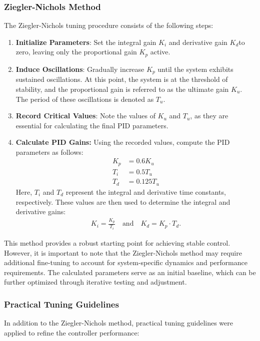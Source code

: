\subsubsection{Ziegler-Nichols Method}
The Ziegler-Nichols tuning procedure consists of the following steps:
\begin{enumerate}
	\item \textbf{Initialize Parameters}: Set the integral gain \( K_i \) and derivative gain \( K_d \)to zero, leaving only the proportional gain \( K_p \) active.
	\item \textbf{Induce Oscillations}: Gradually increase \( K_p \) until the system exhibits sustained oscillations. At this point, the system is at the threshold of stability, and the proportional gain is referred to as the ultimate gain \( K_u \). The period of these oscillations is denoted as \( T_u \).
	\item \textbf{Record Critical Values}: Note the values of \( K_u \) and \( T_u \), as they are essential for calculating the final PID parameters.
	\item \textbf{Calculate PID Gains:} Using the recorded values, compute the PID parameters as follows:
	\begin{equation}
	\begin{aligned}
		K_p &= 0.6K_u \\
		T_i &= 0.5T_u \\
		T_d &= 0.125T_u  \label{eq:eq}
	\end{aligned}
	\end{equation}
	Here, \( T_i \) and \( T_d \) represent the integral and derivative time constants, respectively. These values are then used to determine the integral and derivative gains:
	\begin{equation}
	\begin{aligned}
	K_i = \frac{K_p}{T_i} \quad \text{and} \quad K_d = K_p \cdot T_d.  \label{eq:eq}
	\end{aligned}
	\end{equation}
\end{enumerate}
	
This method provides a robust starting point for achieving stable control. However, it is important to note that the Ziegler-Nichols method may require additional fine-tuning to account for system-specific dynamics and performance requirements. The calculated parameters serve as an initial baseline, which can be further optimized through iterative testing and adjustment.


\subsubsection{Practical Tuning Guidelines}
In addition to the Ziegler-Nichols method, practical tuning guidelines were applied to refine the controller performance:

